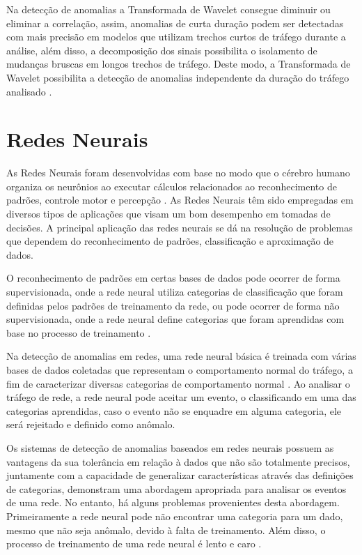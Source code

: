 \indent Na detecção de anomalias a Transformada de Wavelet consegue diminuir ou eliminar a correlação, assim, anomalias de curta duração podem ser detectadas com mais precisão em modelos que utilizam trechos curtos de tráfego durante a análise, além disso, a decomposição dos sinais possibilita o isolamento de mudanças bruscas em longos trechos de tráfego. Deste modo, a Transformada de Wavelet possibilita a detecção de anomalias independente da duração do tráfego analisado \cite{Wang2009}.

  \section{Redes Neurais}
\indent As Redes Neurais foram desenvolvidas com base no modo que o cérebro humano organiza os neurônios ao executar cálculos relacionados ao reconhecimento de padrões, controle motor e percepção \cite{Bhuyan}. As Redes Neurais têm sido empregadas em diversos tipos de aplicações que visam um bom desempenho em tomadas de decisões. A principal aplicação das redes neurais se dá na resolução de problemas que dependem do reconhecimento de padrões, classificação e aproximação de dados.

\indent O reconhecimento de padrões em certas bases de dados pode ocorrer de forma supervisionada, onde a rede neural utiliza categorias de classificação que foram definidas pelos padrões de treinamento da rede, ou pode ocorrer de forma não supervisionada, onde a rede neural define categorias que foram aprendidas com base no processo de treinamento \cite{ripley1996}.

\indent Na detecção de anomalias em redes, uma rede neural básica é treinada com várias bases de dados coletadas que representam o comportamento normal do tráfego, a fim de caracterizar diversas categorias de comportamento normal \cite{chandola2009}. Ao analisar o tráfego de rede, a rede neural pode aceitar um evento, o classificando em uma das categorias aprendidas, caso o evento não se enquadre em alguma categoria, ele será rejeitado e definido como anômalo.

\indent Os sistemas de detecção de anomalias baseados em redes neurais possuem as  vantagens da sua tolerância em relação à dados que não são totalmente precisos, juntamente com a capacidade de generalizar características através das definições de categorias, demonstram uma abordagem apropriada para analisar os eventos de uma rede. No entanto, há alguns problemas provenientes desta abordagem. Primeiramente a rede neural pode não encontrar uma categoria para um dado, mesmo que não seja anômalo, devido à falta de treinamento. Além disso, o processo de treinamento de uma rede neural é lento e caro \cite{patcha2007}.

